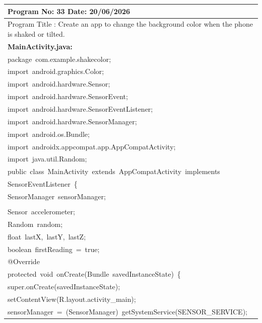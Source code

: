 \documentclass[a4paper,12pt]{article}
\begin{document}
\noindent\begingroup
\renewcommand{\arraystretch}{1.1}
\begin{longtable}{|p{}|}
\hline\endfirsthead\hline\endhead\hline\endfoot\hline\endlastfoot
\rule{0pt}{13pt}Program No: 33 \hfill Date: 20/06/2026 \\
\hline
\rule{0pt}{13pt}Program Title : Create an app to change the background color when the phone is shaked or tilted. \\
\hline
\rule{0pt}{13pt}\textbf{MainActivity.java:} \\
\hline
{\ttfamily\small package\ com.example.shakecolor;} \\
{\ttfamily\small import\ android.graphics.Color;} \\
{\ttfamily\small import\ android.hardware.Sensor;} \\
{\ttfamily\small import\ android.hardware.SensorEvent;} \\
{\ttfamily\small import\ android.hardware.SensorEventListener;} \\
{\ttfamily\small import\ android.hardware.SensorManager;} \\
{\ttfamily\small import\ android.os.Bundle;} \\
{\ttfamily\small import\ androidx.appcompat.app.AppCompatActivity;} \\
{\ttfamily\small import\ java.util.Random;} \\
{\ttfamily\small public\ class\ MainActivity\ extends\ AppCompatActivity\ implements} \\
{\ttfamily\small SensorEventListener\ \{} \\
{\ttfamily\small SensorManager\ sensorManager;} \\
\strut \\
{\ttfamily\small Sensor\ accelerometer;} \\
{\ttfamily\small Random\ random;} \\
{\ttfamily\small float\ lastX,\ lastY,\ lastZ;} \\
{\ttfamily\small boolean\ firstReading\ =\ true;} \\
{\ttfamily\small @Override} \\
{\ttfamily\small protected\ void\ onCreate(Bundle\ savedInstanceState)\ \{} \\
{\ttfamily\small super.onCreate(savedInstanceState);} \\
{\ttfamily\small setContentView(R.layout.activity\_main);} \\
{\ttfamily\small sensorManager\ =\ (SensorManager)\ getSystemService(SENSOR\_SERVICE);} \\

\end{longtable}
\end{document}
